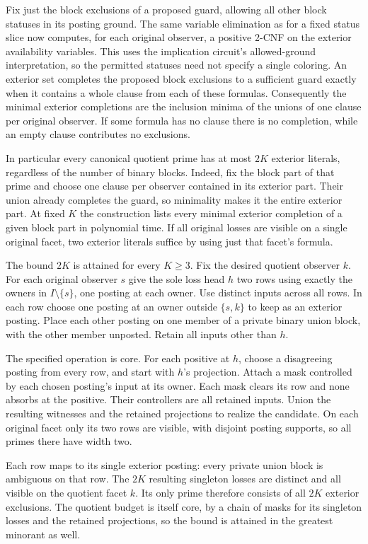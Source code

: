 Fix just the block exclusions of a proposed guard,
allowing all other block statuses in its posting
ground. The same variable elimination as for a
fixed status slice now computes, for each original
observer, a positive 2-CNF on the exterior
availability variables. This uses the implication
circuit's allowed-ground interpretation, so the
permitted statuses need not specify a single
coloring. An exterior set completes the proposed
block exclusions to a sufficient guard exactly
when it contains a whole clause from each of
these formulas. Consequently the minimal exterior
completions are the inclusion minima of the
unions of one clause per original observer.
If some formula has no clause there is no
completion, while an empty clause contributes
no exclusions.

In particular every canonical quotient prime has
at most $2K$ exterior literals, regardless of
the number of binary blocks. Indeed, fix the
block part of that prime and choose one clause per
observer contained in its exterior part. Their
union already completes the guard, so minimality
makes it the entire exterior part. At fixed $K$
the construction lists every minimal exterior
completion of a given block part in polynomial
time. If all original losses are visible on a
single original facet, two exterior literals
suffice by using just that facet's formula.

The bound $2K$ is attained for every $K\ge3$.
Fix the desired quotient observer $k$. For each
original observer $s$ give the sole loss head $h$
two rows using exactly the owners in $I\setminus
\{s\}$, one posting at each owner. Use distinct
inputs across all rows. In each row choose one
posting at an owner outside $\{s,k\}$ to keep as
an exterior posting. Place each other posting
on one member of a private binary union block,
with the other member unposted. Retain all inputs
other than $h$.

The specified operation is core. For each positive
at $h$, choose a disagreeing posting from every row,
and start with $h$'s projection. Attach a mask
controlled by each chosen posting's input at its
owner. Each mask clears its row and none absorbs
at the positive. Their controllers are all retained
inputs. Union the resulting witnesses and the
retained projections to realize the candidate.
On each original facet only its two rows are
visible, with disjoint posting supports, so all
primes there have width two.

Each row maps to its single exterior posting:
every private union block is ambiguous on that
row. The $2K$ resulting singleton losses are
distinct and all visible on the quotient facet
$k$. Its only prime therefore consists of all
$2K$ exterior exclusions. The quotient budget is
itself core, by a chain of masks for its singleton
losses and the retained projections, so the bound
is attained in the greatest minorant as well.

